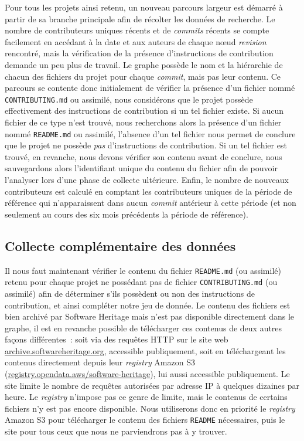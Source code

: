 \documentclass[dvipsnames]{llncs}
\newcommand{\en}[1]{\foreignlanguage{english}{\emph{#1}}}
\begin{document}
    Pour tous les projets ainsi retenu, un nouveau parcours largeur est démarré à partir de sa branche
    principale afin de récolter les données de recherche. Le nombre de contributeurs uniques récents et de
    \en{commits} récents se compte facilement en accédant à la date et aux auteurs de chaque nœud
    \en{revision} rencontré, mais la vérification de la présence d'instructions de contribution demande un peu
    plus de travail. Le graphe possède le nom et la hiérarchie de chacun des fichiers du projet pour chaque
    \en{commit}, mais pas leur contenu. Ce parcours se contente donc initialement de vérifier la présence d'un
    fichier nommé \texttt{CONTRIBUTING.md} ou assimilé, nous considérons que le projet possède effectivement
    des instructions de contribution si un tel fichier existe. Si aucun fichier de ce type n'est trouvé, nous
    recherchons alors la présence d'un fichier nommé \texttt{README.md} ou assimilé, l'absence d'un tel
    fichier nous permet de conclure que le projet ne possède \emph{pas} d'instructions de contribution. Si un
    tel fichier est trouvé, en revanche, nous devons vérifier son contenu avant de conclure, nous sauvegardons
    alors l'identifiant unique du contenu du fichier afin de pouvoir l'analyser lors d'une phase de collecte
    ultérieure. Enfin, le nombre de nouveaux contributeurs est calculé en comptant les contributeurs uniques
    de la période de référence qui n'apparaissent dans aucun \en{commit} antérieur à cette période (et non
    seulement au cours des six mois précédents la période de référence).

    \subsection{Collecte complémentaire des données}
    \label{sec:collectreadme}

    Il nous faut maintenant vérifier le contenu du fichier \texttt{README.md} (ou assimilé) retenu pour chaque
    projet ne possédant pas de fichier \texttt{CONTRIBUTING.md} (ou assimilé) afin de déterminer s'ils
    possèdent ou non des instructions de contribution, et ainsi compléter notre jeu de donnée. Le contenu des
    fichiers est bien archivé par Software Heritage mais n'est pas disponible directement dans le graphe, il
    est en revanche possible de télécharger ces contenus de deux autres façons différentes : soit via des
    requêtes HTTP sur le site web \href{https://archive.softwareheritage.org/}{archive.softwareheritage.org},
    accessible publiquement, soit en téléchargeant les contenus directement depuis leur \en{registry} Amazon
    S3 (\href{https://registry.opendata.aws/software-heritage}{registry.opendata.aws/software-heritage}), lui
    aussi accessible publiquement. Le site limite le nombre de requêtes autorisées par adresse IP à quelques
    dizaines par heure. Le \en{registry} n'impose pas ce genre de limite, mais le contenus de certains
    fichiers n'y est pas encore disponible. Nous utiliserons donc en priorité le \en{registry} Amazon S3 pour
    télécharger le contenu des fichiers \texttt{README} nécessaires, puis le site pour tous ceux que nous ne
    parviendrons pas à y trouver.
\end{document}
